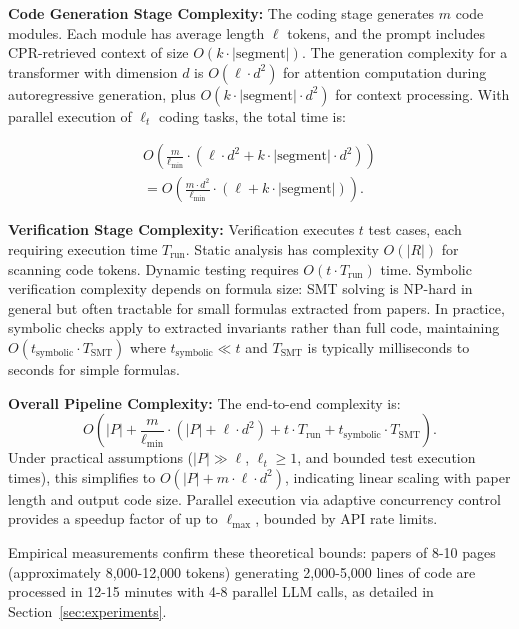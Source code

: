 \documentclass{ieeeaccess}
\begin{document}
\textbf{Code Generation Stage Complexity:} The coding stage generates \(m\) code modules. Each module has average length \(\ell\) tokens, and the prompt includes CPR-retrieved context of size \(O(k \cdot |\text{segment}|)\). The generation complexity for a transformer with dimension \(d\) is \(O(\ell \cdot d^2)\) for attention computation during autoregressive generation, plus \(O(k \cdot |\text{segment}| \cdot d^2)\) for context processing. With parallel execution of \(\ell_t\) coding tasks, the total time is:

\begin{equation}
\begin{split}
O\!\left(\frac{m}{\ell_{\min}} \cdot (\ell \cdot d^2 + k \cdot |\text{segment}| \cdot d^2)\right) \\
= O\!\left(\frac{m \cdot d^2}{\ell_{\min}} \cdot (\ell + k \cdot |\text{segment}|)\right).
\end{split}
\end{equation}

\textbf{Verification Stage Complexity:} Verification executes \(t\) test cases, each requiring execution time \(T_{\text{run}}\). Static analysis has complexity \(O(|R|)\) for scanning code tokens. Dynamic testing requires \(O(t \cdot T_{\text{run}})\) time. Symbolic verification complexity depends on formula size: SMT solving is NP-hard in general but often tractable for small formulas extracted from papers. In practice, symbolic checks apply to extracted invariants rather than full code, maintaining \(O(t_{\text{symbolic}} \cdot T_{\text{SMT}})\) where \(t_{\text{symbolic}} \ll t\) and \(T_{\text{SMT}}\) is typically milliseconds to seconds for simple formulas.

\textbf{Overall Pipeline Complexity:} The end-to-end complexity is:
\begin{equation}
O\left(|P| + \frac{m}{\ell_{\min}} \cdot (|P| + \ell \cdot d^2) + t \cdot T_{\text{run}} + t_{\text{symbolic}} \cdot T_{\text{SMT}}\right).
\end{equation}
Under practical assumptions (\(|P| \gg \ell\), \(\ell_t \geq 1\), and bounded test execution times), this simplifies to \(O(|P| + m \cdot \ell \cdot d^2)\), indicating linear scaling with paper length and output code size. Parallel execution via adaptive concurrency control provides a speedup factor of up to \(\ell_{\max}\), bounded by API rate limits.

Empirical measurements confirm these theoretical bounds: papers of 8-10 pages (approximately 8,000-12,000 tokens) generating 2,000-5,000 lines of code are processed in 12-15 minutes with 4-8 parallel LLM calls, as detailed in Section~\ref{sec:experiments}.
\end{document}
